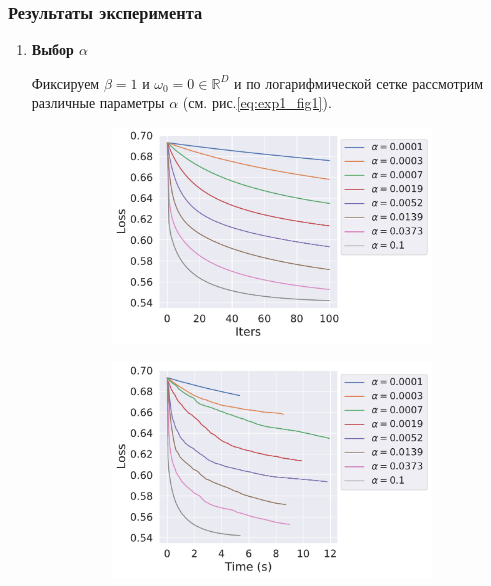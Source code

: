 \subsubsection{Результаты эксперимента}
\begin{enumerate}
	\item {\bfseries  Выбор $\alpha$}
	
	Фиксируем $\beta = 1$ и $\omega_0 = 0 \in \mathbb{R}^D$ и по логарифмической сетке рассмотрим различные параметры $\alpha$ (см. рис.\ref{eq:exp1_fig1}).
    \newsavebox{\myimage}
    \begin{figure}[h]
        \begin{subfigure}{.5\textwidth}
            \centering
            \includegraphics[width=\linewidth]{./experiment1/alpha/gd_loss__iters.pdf}
            \caption{}
        \end{subfigure}%
        \begin{subfigure}{.5\textwidth}
            \centering
            \includegraphics[width=\linewidth]{./experiment1/alpha/gd_loss_time.pdf}

\end{subfigure}
\end{figure}
\end{enumerate}
